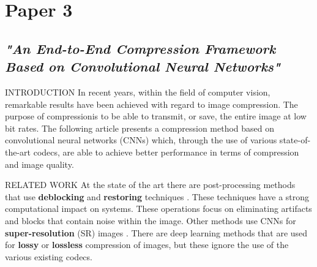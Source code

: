 \section{Paper 3}
\subsection{\emph{"An End-to-End Compression Framework Based on Convolutional Neural Networks"}}

\begin{frame}{INTRODUCTION}
    In recent years, within the field of computer vision, remarkable results 
    have been achieved with regard to image compression. The purpose of 
    compressionis to be able to transmit, or save, the entire image at low bit 
    rates. The following article presents a compression method based on 
    convolutional neural networks (CNNs) which, through the use of various 
    state-of-the-art codecs, are able to achieve better performance in terms 
    of compression and image quality.
\end{frame}

\begin{frame}{RELATED WORK}
    At the state of the art there are post-processing methods that use 
    {\bfseries{deblocking}} and {\bfseries{restoring}} techniques . These techniques have a strong 
    computational impact on systems. These operations focus on eliminating 
    artifacts and blocks that contain noise within the image. Other methods 
    use CNNs for {\bfseries{super-resolution}} (SR) images . There are deep learning 
    methods that are used for {\bfseries{lossy}}  or {\bfseries{lossless}}  compression of images, but 
    these ignore the use of the various existing codecs.
\end{frame}

